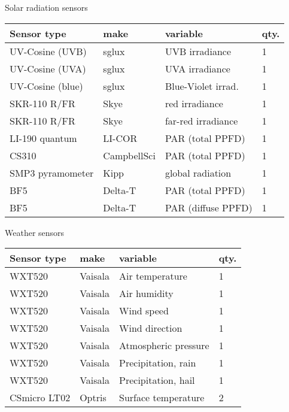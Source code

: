 \documentclass[
  ignorenonframetext,
]{beamer}
\begin{document}
\begin{frame}{Solar radiation sensors}
\protect\hypertarget{solar-radiation-sensors}{}
\begin{longtable}[]{@{}llll@{}}
\toprule
Sensor type & make & variable & qty. \\
\midrule
\endhead
UV-Cosine (UVB) & sglux & UVB irradiance & 1 \\
UV-Cosine (UVA) & sglux & UVA irradiance & 1 \\
UV-Cosine (blue) & sglux & Blue-Violet irrad. & 1 \\
SKR-110 R/FR & Skye & red irradiance & 1 \\
SKR-110 R/FR & Skye & far-red irradiance & 1 \\
LI-190 quantum & LI-COR & PAR (total PPFD) & 1 \\
CS310 & CampbellSci & PAR (total PPFD) & 1 \\
SMP3 pyramometer & Kipp & global radiation & 1 \\
BF5 & Delta-T & PAR (total PPFD) & 1 \\
BF5 & Delta-T & PAR (diffuse PPFD) & 1 \\
\bottomrule
\end{longtable}
\end{frame}

\begin{frame}{Weather sensors}
\protect\hypertarget{weather-sensors}{}
\begin{longtable}[]{@{}llll@{}}
\toprule
Sensor type & make & variable & qty. \\
\midrule
\endhead
WXT520 & Vaisala & Air temperature & 1 \\
WXT520 & Vaisala & Air humidity & 1 \\
WXT520 & Vaisala & Wind speed & 1 \\
WXT520 & Vaisala & Wind direction & 1 \\
WXT520 & Vaisala & Atmospheric pressure & 1 \\
WXT520 & Vaisala & Precipitation, rain & 1 \\
WXT520 & Vaisala & Precipitation, hail & 1 \\
CSmicro LT02 & Optris & Surface temperature & 2 \\
\bottomrule
\end{longtable}
\end{frame}
\end{document}
